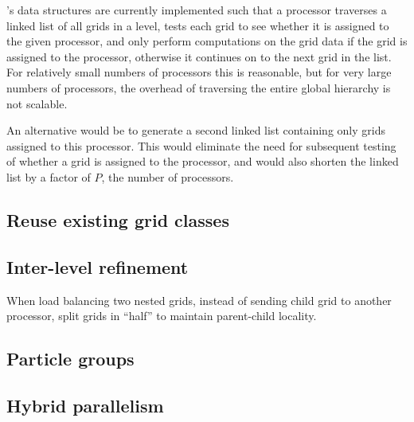 \documentclass{article}
\begin{document}
  \enzo's data structures are currently implemented such that a
  processor traverses a linked list of all grids in a level, tests
  each grid to see whether it is assigned to the given processor, and
  only perform computations on the grid data if the grid is assigned
  to the processor, otherwise it continues on to the next grid in the
  list.  For relatively small numbers of processors this is
  reasonable, but for very large numbers of processors, the overhead
  of traversing the entire global hierarchy is not scalable.

  An alternative would be to generate a second linked list containing
  only grids assigned to this processor.  This would eliminate the
  need for subsequent testing of whether a grid is assigned to the
  processor, and would also shorten the linked list by a factor of
  $P$, the number of processors.

\subsection{Reuse existing grid classes} \label{solution:amr-grid-reuse}


\subsection{Inter-level refinement} \label{solution:amr-balance-split}

When load balancing two nested grids, instead of
sending child grid to another processor, split grids
in ``half'' to maintain parent-child locality.

\subsection{Particle groups} \label{solution:particles-group}


\subsection{Hybrid parallelism}\label{solution:parallel-hybrid}
\end{document}
